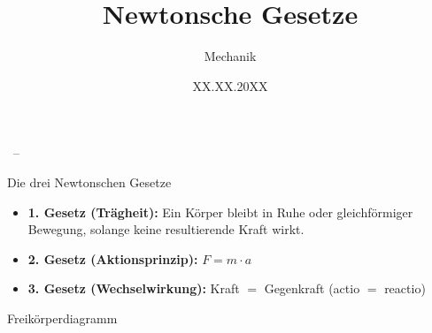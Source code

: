 
\title{Newtonsche Gesetze}
\subtitle{Mechanik}
\author{}
\date{XX.XX.20XX}



\begin{frame}[plain]
  \centering
  {\inserttitle\par}
  \vspace{0.3em}
  {\large\insertsubtitle\par}
  \vspace{1.5em}
  {\normalsize\insertinstitute\ -- \insertdate\par}
\end{frame}

\begin{frame}{Die drei Newtonschen Gesetze}
  \begin{itemize}
    \item \textbf{1. Gesetz (Trägheit):} Ein Körper bleibt in Ruhe oder
      gleichförmiger Bewegung, solange keine resultierende Kraft wirkt.
    \item \textbf{2. Gesetz (Aktionsprinzip):} $F = m \cdot a$
    \item \textbf{3. Gesetz (Wechselwirkung):} Kraft $=$ Gegenkraft
      (actio $=$ reactio)
  \end{itemize}
\end{frame}

\begin{frame}{Freikörperdiagramm}
  \centering
\end{frame}


